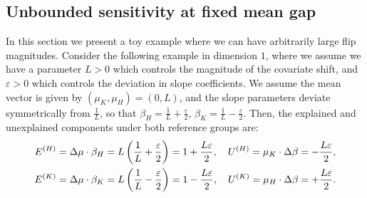 



\subsection{Unbounded sensitivity at fixed mean gap}
 \label{ex:unbounded}
In this section we present a toy example where we can have arbitrarily large flip magnitudes. Consider the following example in dimension \( 1 \), where we assume we have a parameter \( L > 0 \) which controls the magnitude of the covariate shift, and \( \varepsilon > 0 \) which controls the deviation in slope coefficients. We assume the mean vector is given by \( (\mu_K, \mu_H) = (0, L) \), and the slope parameters deviate symmetrically from \( \frac{1}{L} \), so that \( \beta_H = \frac{1}{L} + \frac{\varepsilon}{2} \), \( \beta_K = \frac{1}{L} - \frac{\varepsilon}{2} \). Then, the explained and unexplained components under both reference groups are:
\begin{align*}
    E^{(H)} &= \Delta\mu \cdot \beta_H = L\left(\frac{1}{L} + \frac{\varepsilon}{2}\right) = 1 + \frac{L\varepsilon}{2}, \quad U^{(H)} = \mu_K \cdot \Delta\beta = -\frac{L\varepsilon}{2}, \\
    E^{(K)} &= \Delta\mu \cdot \beta_K = L\left(\frac{1}{L} - \frac{\varepsilon}{2}\right) = 1 - \frac{L\varepsilon}{2}, \quad U^{(K)} = \mu_H \cdot \Delta\beta = +\frac{L\varepsilon}{2}.
\end{align*}

